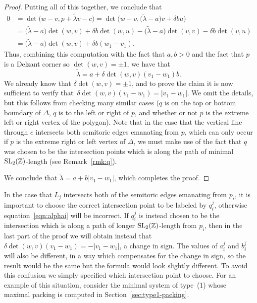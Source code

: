\documentclass[10pt,a4paper]{amsart}
\numberwithin{equation}{section}
\def\Z{{\mathbb Z}}
\newcommand{\De}{\Delta}
\newcommand{\SL}{{\rm SL}_2(\Z)}
\theoremstyle{definition}
\theoremstyle{plain}
\theoremstyle{plain}
\begin{document}
\begin{proof}
Putting all of this together, we conclude that
\begin{align*}
 0 & = \det \big(w - v, p+\widetilde{\lambda}v-c\big) = \det \big(w-v, \big(\widetilde{\lambda} - a\big)v + \delta bu\big)\\
 & = \big(\widetilde{\lambda} - a\big)\det (w,v) + \delta b \det (w, u) - \big(\widetilde{\lambda}-a\big) \det (v, v) - \delta b \det (v, u)\\
 & = \big(\widetilde{\lambda} - a\big) \det (w,v) + \delta b(w_1 - v_1).
\end{align*}
Thus, combining this computation with the fact that $a,b>0$ and the fact that $p$ is a Delzant corner so $\det(w,v)=\pm 1$, we have that
\[
 \widetilde{\lambda} = a + \delta \det(w,v) (v_1-w_1)b.
\]
We already know that $\delta \det(w,v) = \pm 1$, and to prove the claim it is now sufficient to verify that~$\delta \det(w,v) (v_1-w_1) = |v_1-w_1|$.
We omit the details, but this follows from checking many similar cases ($q$ is on the top or bottom boundary of $\De$, $q$ is to the left or right of $p$, and whether or not $p$ is the extreme left or right vertex of the polygon). Note that in the case that the vertical line through $c$ intersects both semitoric edges emanating from $p$, which can only occur if $p$ is the extreme right or left vertex of $\De$, we must make use of the fact that $q$ was chosen to be the intersection points which is along the path of minimal $\SL$-length (see Remark~\ref{rmk:q}).

We conclude that $\widetilde{\lambda} = a + b|v_1-w_1|$, which completes the proof.
\end{proof}

\begin{Remark}\label{rmk:q}
In the case that $L_j$ intersects both of the semitoric edges emanating from $p_i$, it is important to choose the correct intersection point to be labeled by $q_i^j$, otherwise equation~\eqref{eqn:alphai} will be incorrect.
If $q_i^j$ is instead chosen to be the intersection which is along a path of longer $\SL$-length from $p_i$, then
in the last part of the proof we will obtain instead that $\delta \det(w,v) (v_1-w_1) = -|v_1-w_1|$, a change in sign.
The values of $a_i^j$ and $b_i^j$ will also be different, in a way which compensates for the change in sign, so the result would be the same but the formula would look slightly different. To avoid this confusion we simply specified which intersection point to choose.
For an example of this situation, consider
the minimal system of type~(1) whose maximal packing is computed in Section~\ref{sec:type1-packing}.
\end{Remark}
\end{document}
